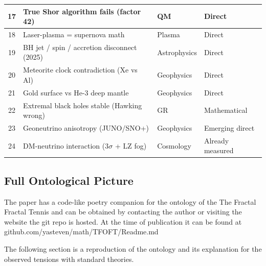 \documentclass[11pt,a4paper]{article}
\begin{document}
\begin{longtable}{|c|p{4.5cm}|p{2.5cm}|p{2cm}|}
    \hline
    17 & True Shor algorithm fails (factor 42) & QM & Direct \\
    \hline
    18 & Laser-plasma = supernova math & Plasma & Direct \\
    \hline
    19 & BH jet / spin / accretion disconnect (2025) & Astrophysics & Direct \\
    \hline
    20 & Meteorite clock contradiction (Xe vs Al) & Geophysics & Direct \\
    \hline
    21 & Gold surface vs He-3 deep mantle & Geophysics & Direct \\
    \hline
    22 & Extremal black holes stable (Hawking wrong) & GR & Mathematical \\
    \hline
    23 & Geoneutrino anisotropy (JUNO/SNO+) & Geophysics & Emerging direct \\
    \hline
    24 & DM-neutrino interaction (3$\sigma$ + LZ fog) & Cosmology & Already measured \\
    \hline
  \end{longtable}

  \subsection {Full Ontological Picture}

    The paper has a code-like poetry companion for the ontology of the The Fractal Fractal Tennis and can be obtained by contacting the author or visiting the website the git repo is hosted. At the time of publication it can be found at github.com/yasteven/math/TFOFT/Readme.md

    The following section is a reproduction of the ontology and its explanation for the observed tensions with standard theories.
\end{document}
